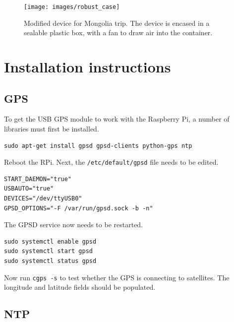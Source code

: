 \documentclass[11pt,twosided,a4paper]{report}
\begin{document}
\begin{figure}[!tb]
\centering
\texttt{[image: images/robust\_case]}
\caption[Modified device for Mongolia trip.]{Modified device for Mongolia trip. The device is encased in a sealable plastic box, with a fan to draw air into the container.}
\label{fig:modified_device}
\end{figure}



\clearpage
\newpage
{}


\pagebreak

\appendix

\chapter{Installation instructions}

\section{GPS} \label{GPS}

To get the USB GPS module to work with the Raspberry Pi, a number of libraries must first be installed.
\begin{lstlisting}
sudo apt-get install gpsd gpsd-clients python-gps ntp
\end{lstlisting}
Reboot the RPi. Next, the \texttt{/etc/default/gpsd} file needs to be edited.
\begin{lstlisting}
START_DAEMON="true"
USBAUTO="true"
DEVICES="/dev/ttyUSB0"
GPSD_OPTIONS="-F /var/run/gpsd.sock -b -n"
\end{lstlisting}
The GPSD service now needs to be restarted.
\begin{lstlisting}
sudo systemctl enable gpsd
sudo systemctl start gpsd
sudo systemctl status gpsd
\end{lstlisting}
Now run \texttt{cgps -s} to test whether the GPS is connecting to satellites. The longitude and latitude fields should be populated.

\section{NTP} \label{NTP}
\end{document}
